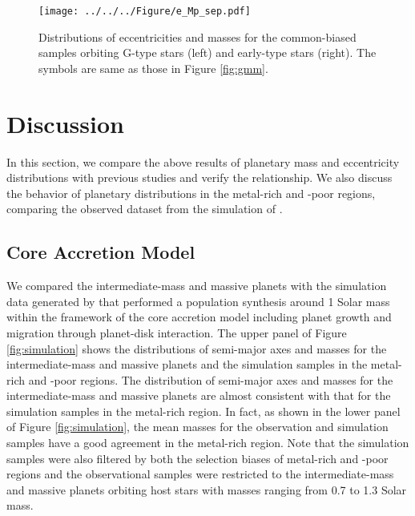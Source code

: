 \documentclass[twocolumn, dvipdfmx]{aastex62}
\begin{document}
\begin{CJK*}{UTF8}{min}
\begin{figure}[t]
\begin{center}
\texttt{[image: ../../../Figure/e\_Mp\_sep.pdf]}
\caption{Distributions of eccentricities and masses for the common-biased samples orbiting G-type stars (left) and early-type stars (right). The symbols are same as those in Figure \ref{fig:gmm}. \label{fig:e_Mp_sep}}
\end{center}
\end{figure}


\section{Discussion} \label{sec:discussion}

In this section, we compare the above results of planetary mass and eccentricity distributions with previous studies and verify the relationship. We also discuss the behavior of planetary distributions in the metal-rich and -poor regions, comparing the observed dataset from the simulation of \cite{2012A&A...541A..97M}.


\subsection{Core Accretion Model} \label{subsec:accretion}

We compared the intermediate-mass and massive planets with the simulation data generated by \cite{2012A&A...541A..97M} that performed a population synthesis around 1 Solar mass within the framework of the core accretion model including planet growth and migration through planet-disk interaction. The upper panel of Figure \ref{fig:simulation} shows the distributions of semi-major axes and masses for the intermediate-mass and massive planets and the simulation samples in the metal-rich and -poor regions. The distribution of semi-major axes and masses for the intermediate-mass and massive planets are almost consistent with that for the simulation samples in the metal-rich region. In fact, as shown in the lower panel of Figure \ref{fig:simulation}, the mean masses for the observation and simulation samples have a good agreement in the metal-rich region. Note that the simulation samples were also filtered by both the selection biases of metal-rich and -poor regions and the observational samples were restricted to the intermediate-mass and massive planets orbiting host stars with masses ranging from 0.7 to 1.3 Solar mass.


\end{CJK*}
\end{document}
